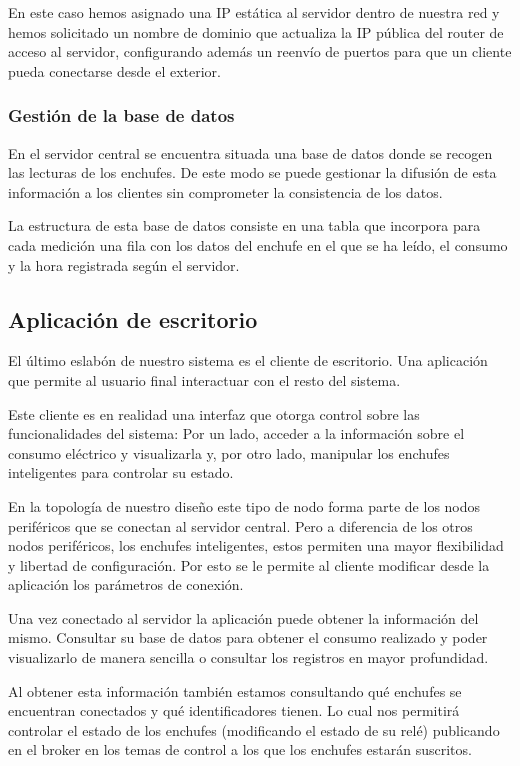 \documentclass[a4paper,10pt]{article}
\begin{document}
En este caso hemos asignado una IP estática al servidor dentro de
nuestra red y hemos solicitado un nombre de dominio que actualiza la
IP pública del router de acceso al servidor, configurando además un
reenvío de puertos para que un cliente pueda conectarse desde el exterior.

\subsubsection{Gestión de la base de datos}

En el servidor central se encuentra situada una base de datos donde se
recogen las lecturas de los enchufes. De este modo se puede gestionar
la difusión de esta información a los clientes sin comprometer la
consistencia de los datos.

La estructura de esta base de datos consiste en una tabla que
incorpora para cada medición una fila con los datos del enchufe en el
que se ha leído, el consumo y la hora registrada según el servidor.

\newpage

\subsection{Aplicación de escritorio}

El último eslabón de nuestro sistema es el cliente de escritorio. Una
aplicación que permite al usuario final interactuar con el resto del
sistema.

Este cliente es en realidad una interfaz que otorga control sobre las
funcionalidades del sistema: Por un lado, acceder a la información
sobre el consumo eléctrico y visualizarla y, por otro lado, manipular
los enchufes inteligentes para controlar su estado.

En la topología de nuestro diseño este tipo de nodo forma parte de los
nodos periféricos que se conectan al servidor central. Pero a
diferencia de los otros nodos periféricos, los enchufes inteligentes,
estos permiten una mayor flexibilidad y libertad de configuración. Por
esto se le permite al cliente modificar desde la aplicación los
parámetros de conexión.

Una vez conectado al servidor la aplicación puede obtener la
información del mismo. Consultar su base de datos para obtener el
consumo realizado y poder visualizarlo de manera sencilla o consultar
los registros en mayor profundidad.

Al obtener esta información también estamos consultando qué enchufes
se encuentran conectados y qué identificadores tienen. Lo cual nos
permitirá controlar el estado de los enchufes (modificando el estado
de su relé) publicando en el broker en los temas de control a los que
los enchufes estarán suscritos.
\end{document}
